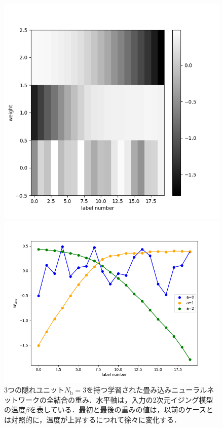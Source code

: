 \documentclass[a4paper,11pt]{jsreport}
\begin{document}
\begin{figure}[H]
  \begin{minipage}[b]{0.45\linewidth}
    \begin{center}
      \includegraphics[keepaspectratio, scale=0.4]{image/温度測定器2_L16_CNN_Nh3_pram.png}
    \end{center}
  \end{minipage}
  \begin{minipage}[b]{0.45\linewidth}
    \begin{center}
      \includegraphics[keepaspectratio, scale=0.4]{image/温度測定器2_L16_CNN_Nh3_weight_plot.png}
    \end{center}
  \end{minipage}
  \caption{3つの隠れユニット$N_{\text{h}}=3$を持つ学習された畳み込みニューラルネットワークの全結合の重み．水平軸は，入力の2次元イジング模型の温度$\beta$を表している．最初と最後の重みの値は，以前のケースとは対照的に，温度が上昇するにつれて徐々に変化する．}
  \label{温度測定器CNN2重みプロット}
\end{figure}
\end{document}
